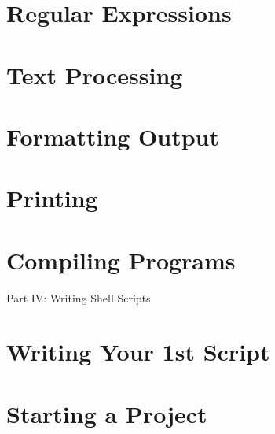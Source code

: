 \documentclass[oneside]{book}
\numberwithin{equation}{section}
\begin{document}

\section{Regular Expressions}


\section{Text Processing}


\section{Formatting Output}


\section{Printing}


\section{Compiling Programs}


\begin{center}
	\huge Part IV: Writing Shell Scripts
\end{center}


\section{Writing Your 1st Script}


\section{Starting a Project}
\end{document}
